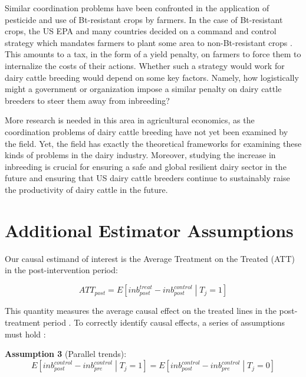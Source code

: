 \documentclass[12pt,letterpaper]{article}
\begin{document}
Similar coordination problems have been confronted in the application of pesticide and use of Bt-resistant crops by farmers.
In the case of Bt-resistant crops, the US EPA and many countries decided on a command and control strategy which mandates farmers to plant some area to non-Bt-resistant crops \citep{huang2011success}.
This amounts to a tax, in the form of a yield penalty, on farmers to force them to internalize the costs of their actions.
Whether such a strategy would work for dairy cattle breeding would depend on some key factors.
Namely, how logistically might a government or organization impose a similar penalty on dairy cattle breeders to steer them away from inbreeding?

More research is needed in this area in agricultural economics, as the coordination problems of dairy cattle breeding have not yet been examined by the field.
Yet, the field has exactly the theoretical frameworks for examining these kinds of problems in the dairy industry.
Moreover, studying the increase in inbreeding is crucial for ensuring a safe and global resilient dairy sector in the future and ensuring that US dairy cattle breeders continue to sustainably raise the productivity of dairy cattle in the future.


\newpage

\clearpage

\appendix


\section{Additional Estimator Assumptions}
\label{app:estimator}
Our causal estimand of interest is the Average Treatment on the Treated (ATT) in the post-intervention period:

\begin{equation*}
    ATT_{post}=E\left[inb_{post}^{treat}-inb_{post}^{control} \middle| T_{j}=1\right]
\end{equation*}

This quantity measures the average causal effect on the treated lines in the post-treatment period \citep{Roth2023}. To correctly identify causal effects, a series of assumptions must hold \citep{Sun2021}:

\medskip
\textbf{Assumption 3} (Parallel trends): 
\begin{equation*}
    E\left[inb_{post}^{control}-inb_{pre}^{control}\middle| T_{j}=1\right] = E\left[inb_{post}^{control}-inb_{pre}^{control} \middle| T_{j}=0\right]
\end{equation*}
\end{document}
